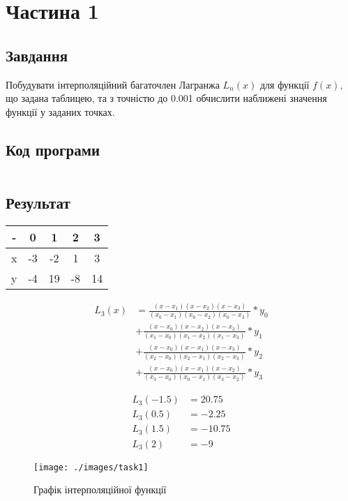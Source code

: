 \section{Частина 1}
\label{sec:task1}

\subsection{Завдання}
\label{subsec:task1_task}

Побудувати інтерполяційний багаточлен Лагранжа $L_n(x)$
для функції $f(x)$, що задана таблицею, та з точністю до 0.001
обчислити наближені значення функції у заданих точках.

\subsection{Код програми}
\label{subsec:task1_code}
\inputminted{python}{../src/task1.py}

\subsection{Результат}
\label{subsec:task1_result}

\begin{tabular}{|c|c|c|c|c|}
    \toprule
    - & 0  & 1  & 2  & 3  \\

    \midrule
    x & -3 & -2 & 1  & 3  \\
    \hline
    y & -4 & 19 & -8 & 14 \\

    \bottomrule
\end{tabular}

\begin{align}
    L_3(x)
     & = \frac{(x - x_1)(x - x_2)(x - x_3)}{(x_0 - x_1)(x_0 - x_2)(x_0 - x_3)} * y_0 \\
     & + \frac{(x - x_0)(x - x_2)(x - x_3)}{(x_1 - x_0)(x_1 - x_2)(x_1 - x_3)} * y_1 \\
     & + \frac{(x - x_0)(x - x_1)(x - x_3)}{(x_2 - x_0)(x_2 - x_1)(x_2 - x_3)} * y_2 \\
     & + \frac{(x - x_0)(x - x_1)(x - x_2)}{(x_3 - x_0)(x_0 - x_1)(x_3 - x_2)} * y_3
\end{align}

\begin{align}
    L_3(-1.5) & = 20.75  \\
    L_3(0.5)  & = -2.25  \\
    L_3(1.5)  & = -10.75 \\
    L_3(2)    & = -9
\end{align}

\begin{figure}[!ht]
    \centering
    \texttt{[image: ./images/task1]}
    \caption{Графік інтерполяційної функції}
    \label{fig:graph}
\end{figure}
